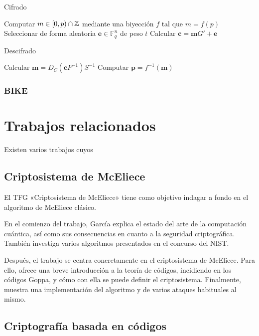\begin{algorithm}
	\caption{Cifrado}\label{alg:1}
	Computar $m \in [0, p) \cap \mathbb{Z}$ mediante una biyección $f$ tal que $m = f(p)$\;
	Seleccionar de forma aleatoria $\textbf{e} \in \mathbb{F}_q^n$ de peso $t$\;
	Calcular $\textbf{c} = \textbf{m}G' + \textbf{e}$\;
\end{algorithm}

\begin{algorithm}
	\caption{Descifrado}\label{alg:1}
	Calcular $\textbf{m} = D_C(\textbf{c}P^{-1})S^{-1}$\;
	Computar $\textbf{p} = f^{-1}(\textbf{m})$\; 
\end{algorithm}

\subsubsection{BIKE}

\section{Trabajos relacionados}

Existen varios trabajos cuyos 

\subsection{Criptosistema de McEliece}
El TFG «Criptosistema de McEliece» \autocite{McEliece2021} tiene como objetivo indagar a fondo en el algoritmo de McEliece clásico.

En el comienzo del trabajo, García explica el estado del arte de la computación cuántica, así como sus consecuencias en cuanto a la seguridad criptográfica. También investiga varios algoritmos presentados en el concurso del NIST.

Después, el trabajo se centra concretamente en el criptosistema de McEliece. Para ello, ofrece una breve introducción a la teoría de códigos, incidiendo en los códigos Goppa, y cómo con ella se puede definir el criptosistema. Finalmente, muestra una implementación del algoritmo y de varios ataques habituales al mismo.

\subsection{Criptografía basada en códigos}

